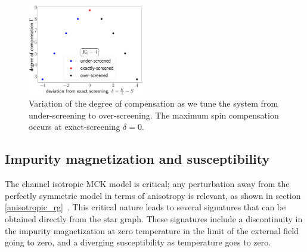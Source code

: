 \documentclass[reprint,prb,superscriptaddress]{revtex4-2}
\begin{document}
\begin{figure}[htpb]
	\centering
	\includegraphics[width=0.45\textwidth]{plt/deg_of_comp.pdf}
	\caption{Variation of the degree of compensation as we tune the system from under-screening to over-screening. The maximum spin compensation occurs at exact-screening \(\delta=0\).}
\end{figure}



\subsection{Impurity magnetization and susceptibility}
The channel isotropic MCK model is critical; any perturbation away from the perfectly symmetric model in terms of anisotropy is relevant, as shown in section \ref{anisotropic_rg}~\cite{vojta_2006,andrew_bulla_2011,pang_cox_1991}. This critical nature leads to several signatures that can be obtained directly from the star graph. These signatures include a discontinuity in the impurity magnetization at zero temperature in the limit of the external field going to zero, and a diverging susceptibility as temperature goes to zero.
\end{document}
